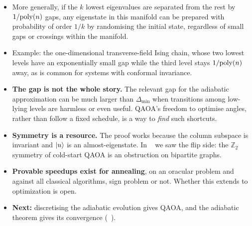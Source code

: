 \documentclass[handoutsbeamer.tex]{subfiles}
\begin{document}
\begin{frame}
\begin{itemize}\setlength\itemsep{0.2em}
    \item More generally, if the $k$ lowest eigenvalues are separated from the rest by $1/{\rm poly}(n)$ gaps, any eigenstate in this manifold can be prepared with probability of order $1/k$ by randomising the initial state, regardless of small gaps or crossings within the manifold.
    \item Example: the one-dimensional transverse-field Ising chain, whose two lowest levels have an exponentially small gap while the third level stays $1/{\rm poly}(n)$ away, as is common for systems with conformal invariance.
\end{itemize}
\end{frame}

\begin{frame}
\begin{itemize}\setlength\itemsep{0.4em}
    \item \textbf{The gap is not the whole story.} The relevant gap for the adiabatic approximation can be much larger than $\Delta_{\min}$ when transitions among low-lying levels are harmless or even useful. QAOA's freedom to optimise angles, rather than follow a fixed schedule, is a way to \emph{find} such shortcuts.
    \item \textbf{Symmetry is a resource.} The proof works because the column subspace is invariant and $\ket u$ is an almost-eigenstate. In \Chap~ we saw the flip side: the $\mathbb Z_2$ symmetry of cold-start QAOA is an obstruction on bipartite graphs.
    \item \textbf{Provable speedups exist for annealing}, on an oracular problem and against all classical algorithms, sign problem or not. Whether this extends to optimization is open.
    \item \textbf{Next:} discretising the adiabatic evolution gives QAOA, and the adiabatic theorem gives its convergence (\Chap~).
\end{itemize}
\end{frame}

\begin{frame}[allowframebreaks]
\biblio
\end{frame}
\end{document}
